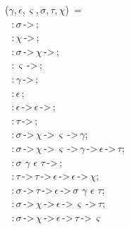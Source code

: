 \begin{holmath}
    (\ensuremath{\gamma},\,\ensuremath{\epsilon},\,\ensuremath{\varsigma},\,\ensuremath{\sigma},\,\ensuremath{\tau},\,\ensuremath{\chi})\, = \HOLTokenLeftrec{}\\
\,\,\,\,:\,\ensuremath{\sigma}\,->\,;\\
\,\,\,\,:\,\ensuremath{\chi}\,->\,;\\
\,\,\,\,:\,\ensuremath{\sigma}\,->\,\ensuremath{\chi}\,->\,;\\
\,\,\,\,:\,\ensuremath{\varsigma}\,->\,;\\
\,\,\,\,:\,\ensuremath{\gamma}\,->\,;\\
\,\,\,\,:\,\ensuremath{\epsilon}\,;\\
\,\,\,\,:\,\ensuremath{\epsilon}\,->\,\ensuremath{\epsilon}\,->\,;\\
\,\,\,\,:\,\ensuremath{\tau}\,->\,;\\
\,\,\,\,:\,\ensuremath{\sigma}\,->\,\ensuremath{\chi}\,->\,\ensuremath{\varsigma}\,->\,\ensuremath{\gamma};\\
\,\,\,\,:\,\ensuremath{\sigma}\,->\,\ensuremath{\chi}\,->\,\ensuremath{\varsigma}\,->\,\ensuremath{\gamma}\,->\,\ensuremath{\epsilon}\,->\,\ensuremath{\tau};\\
\,\,\,\,:\,\ensuremath{\sigma}\,\HOLTokenProd{}\,\ensuremath{\gamma}\,\HOLTokenProd{}\,\ensuremath{\epsilon}\,\HOLTokenProd{}\,\ensuremath{\tau}\,->\,;\\
\,\,\,\,:\,\ensuremath{\tau}\,->\,\ensuremath{\tau}\,->\,\ensuremath{\epsilon}\,->\,\ensuremath{\epsilon}\,->\,\ensuremath{\chi};\\
\,\,\,\,:\,\ensuremath{\sigma}\,->\,\ensuremath{\tau}\,->\,\ensuremath{\epsilon}\,->\,\ensuremath{\sigma}\,\HOLTokenProd{}\,\ensuremath{\gamma}\,\HOLTokenProd{}\,\ensuremath{\epsilon}\,\HOLTokenProd{}\,\ensuremath{\tau};\\
\,\,\,\,:\,\ensuremath{\sigma}\,->\,\ensuremath{\chi}\,->\,\ensuremath{\epsilon}\,->\,\ensuremath{\varsigma}\,->\,\ensuremath{\tau};\\
\,\,\,\,:\,\ensuremath{\sigma}\,->\,\ensuremath{\chi}\,->\,\ensuremath{\epsilon}\,->\,\ensuremath{\tau}\,->\,\ensuremath{\varsigma}\\
\HOLTokenRightrec{} 
\end{holmath} 

